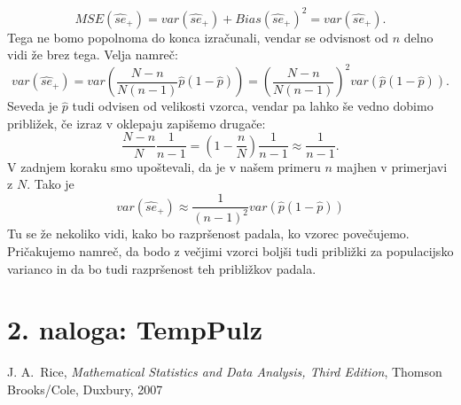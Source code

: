 \documentclass[12pt, letterpaper]{article}
\begin{document}
\[
MSE(\hat{se}_+) = var(\hat{se}_+) + Bias(\hat{se}_+)^2 = var(\hat{se}_+).
\]
Tega ne bomo popolnoma do konca izračunali, vendar se odvisnost od $n$ delno vidi že brez tega. Velja namreč:
\[
var(\hat{se}_+) = var\left(\frac{N-n}{N(n-1)}\hat{p}(1 - \hat{p})\right) = \left(\frac{N-n}{N(n-1)}\right)^2 var(\hat{p}(1 - \hat{p})).
\]
Seveda je $\hat{p}$ tudi odvisen od velikosti vzorca, vendar pa lahko še vedno dobimo približek, če izraz v oklepaju zapišemo drugače:
\[
\frac{N-n}{N}\frac{1}{n-1} = \left(1 - \frac{n}{N}\right)\frac{1}{n-1} \approx \frac{1}{n-1}.
\]
V zadnjem koraku smo upoštevali, da je v našem primeru $n$ majhen v primerjavi z $N$. Tako je
\[
var(\hat{se}_+) \approx \frac{1}{(n-1)^2}var(\hat{p}(1 - \hat{p}))
\]
Tu se že nekoliko vidi, kako bo razpršenost padala, ko vzorec povečujemo. Pričakujemo namreč, da bodo z večjimi vzorci boljši tudi približki za populacijsko varianco in da bo tudi razpršenost teh približkov padala.

\section*{2. naloga: TempPulz}

\begin{thebibliography}{99}
 J. A.~Rice, \emph{Mathematical Statistics and Data Analysis, Third Edition}, Thomson Brooks/Cole, Duxbury, 2007
\end{thebibliography}
\end{document}
